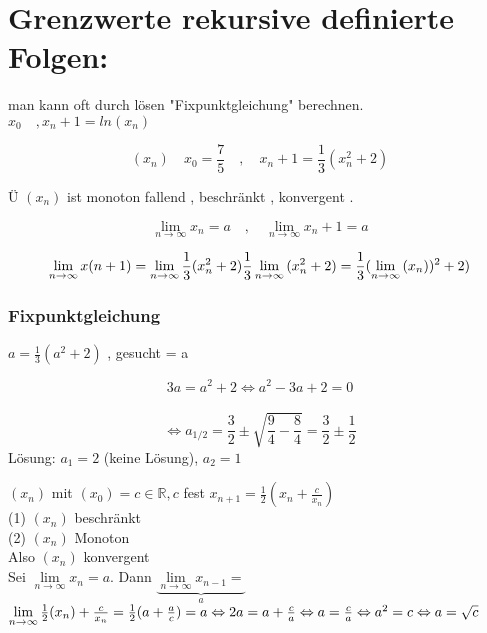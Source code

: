 \newpage

\section{Grenzwerte rekursive definierte Folgen:}

man kann oft durch lösen "Fixpunktgleichung" berechnen.\\
$x_0 \quad , x_n+1 = ln(x_n)$

\begin{example}
\[(x_n) \quad x_0 = \frac{7}{5} \quad,\quad x_n+1= \frac{1}{3}(x_n^2+2)  \]

Ü $(x_n)$ ist monoton fallend , beschränkt , konvergent . 

\[\lim\limits_{n \rightarrow \infty}{x_n}=a \quad,\quad 
\lim\limits_{n \rightarrow \infty}{x_n+1}=a \]

\begin{equation*}
\begin{aligned}
\lim\limits_{n \rightarrow \infty}{x(n+1)} 
= \linebreak  
\lim\limits_{n \rightarrow \infty}{\frac{1}{3}(x_n^2 + 2)
\frac{1}{3}} \lim\limits_{n \rightarrow \infty}{(x_n^2 + 2)}
=
\frac{1}{3} (\lim\limits_{n \rightarrow \infty}{(x_n))^2 + 2)}
\end{aligned}
\end{equation*}
\end{example}

\subsubsection{Fixpunktgleichung }
 $a = \frac{1}{3}(a^2 + 2) $  , gesucht = a
 
\[ 3a = a^2 +2 \Leftrightarrow a^2 -3a+2 = 0 \] \\
\[ \Leftrightarrow a_{1/2} = \frac{3}{2} \pm \sqrt{\frac{9}{4}-\frac{8}{4}}= \frac{3}{2} \pm \frac{1}{2}\]
Lösung:  $a_1 = 2$ (keine Lösung),  $a_2 =1 $

\begin{example}{$(x_n)$ mit $(x_0) = c \in \mathbb{R} , c  $ fest $x_{n+1}= \frac{1}{2}(x_n+\frac{c}{x_n})$ }\\
(1) $(x_n)$ beschränkt \checkmark\\
(2) $(x_n)$ Monoton \checkmark\\
Also $(x_n)$ konvergent \\
Sei $\lim\limits_{n \rightarrow \infty}{x_n}= a $. 
Dann $\underbrace{\lim\limits_{n \rightarrow \infty}{x_{n-1}}= }_{a}$ $\lim\limits_{n \rightarrow \infty}{\frac{1}{2}}(x_n) + \frac{c}{x_n} = \frac{1}{2}(a + \frac{a}{c})= a \\
 \Leftrightarrow 2a = a + \frac{c}{a} \Leftrightarrow a = \frac{c}{a } \Leftrightarrow a^2 = c \Leftrightarrow a = \sqrt{c}$
\end{example}

